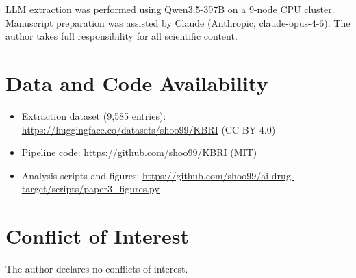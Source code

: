 \documentclass[12pt,a4paper]{article}
\begin{document}
LLM extraction was performed using Qwen3.5-397B on a 9-node CPU cluster. Manuscript preparation was assisted by Claude (Anthropic, claude-opus-4-6). The author takes full responsibility for all scientific content.

\section*{Data and Code Availability}

\begin{itemize}
    \item Extraction dataset (9,585 entries): \url{https://huggingface.co/datasets/shoo99/KBRI} (CC-BY-4.0)
    \item Pipeline code: \url{https://github.com/shoo99/KBRI} (MIT)
    \item Analysis scripts and figures: \url{https://github.com/shoo99/ai-drug-target/scripts/paper3_figures.py}
\end{itemize}

\section*{Conflict of Interest}

The author declares no conflicts of interest.
\end{document}
